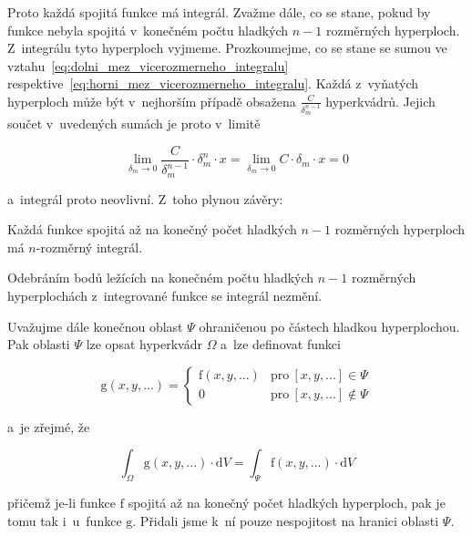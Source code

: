Proto každá spojitá funkce má integrál. Zvažme dále, co se stane, pokud by funkce nebyla spojitá v~konečném počtu hladkých \(n-1\) rozměrných hyperploch. Z~integrálu tyto hyperploch vyjmeme. Prozkoumejme, co se stane se sumou ve vztahu~\eqref{eq:dolni_mez_vicerozmerneho_integralu} respektive~\eqref{eq:horni_mez_vicerozmerneho_integralu}. Každá z~vyňatých hyperploch může být v~nejhorším případě obsažena \(\frac{C}{\delta_m^{n-1}}\) hyperkvádrů. Jejich součet v~uvedených sumách je proto v~limitě

\begin{equation}
\lim_{\delta_m \to 0} \frac{C}{\delta_m^{n-1}} \cdot \delta_m^n \cdot x = \lim_{\delta_m \to 0} C \cdot \delta_m \cdot x = 0 
\end{equation}

a~integrál proto neovlivní. Z~toho plynou závěry:

\begin{fact}
Každá funkce spojitá až na konečný počet hladkých \(n-1\) rozměrných hyperploch má \(n\)-rozměrný integrál.
\end{fact}

\begin{fact}
Odebráním bodů ležících na konečném počtu hladkých \(n-1\) rozměrných hyperplochách z~integrované funkce se integrál nezmění.
\end{fact}

Uvažujme dále konečnou oblast \(\Psi\) ohraničenou po částech hladkou hyperplochou. Pak oblasti \(\Psi\) lze opsat hyperkvádr \(\Omega\) a~lze definovat funkci

\begin{equation}
\mathrm{g}(x, y, ...) = 
\begin{cases}
\mathrm{f}(x, y, ...) & \mathrm{pro} \ [x, y, ...] \in \Psi \\
0 & \mathrm{pro} \ [x, y, ...] \notin \Psi
\end{cases}
\end{equation} 

a~je zřejmé, že

\begin{equation}
\int_{\Omega} \mathrm{g}(x, y, ...) \cdot \mathrm{d}V = \int_{\Psi} \mathrm{f}(x, y, ...) \cdot \mathrm{d}V 
\end{equation}

přičemž je-li funkce \(\mathrm{f}\) spojitá až na konečný počet hladkých hyperploch, pak je tomu tak i~u~funkce \(\mathrm{g}\). Přidali jsme k~ní pouze nespojitost na hranici oblasti \(\Psi\).  

